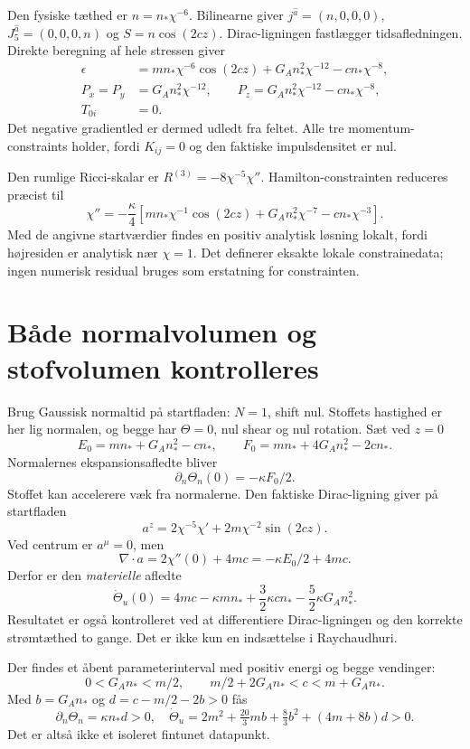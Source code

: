 \documentclass[11pt,a4paper]{article}
\begin{document}
Den fysiske tæthed er $n=n_*\chi^{-6}$. Bilinearne giver $j^{\hat a}=(n,0,0,0)$, $J_5^{\hat a}=(0,0,0,n)$ og $S=n\cos(2cz)$. Dirac-ligningen fastlægger tidsafledningen. Direkte beregning af hele stressen giver
\begin{align*}
 \epsilon&=mn_*\chi^{-6}\cos(2cz)+G_A n_*^2\chi^{-12}-cn_*\chi^{-8},\\
 P_x=P_y&=G_A n_*^2\chi^{-12},\qquad
 P_z=G_A n_*^2\chi^{-12}-cn_*\chi^{-8},\\
 T_{0i}&=0.
\end{align*}
Det negative gradientled er dermed udledt fra feltet. Alle tre momentum-constraints holder, fordi $K_{ij}=0$ og den faktiske impulsdensitet er nul.

Den rumlige Ricci-skalar er $R^{(3)}=-8\chi^{-5}\chi''$. Hamilton-constrainten reduceres præcist til
\[
 \boxed{\chi''=-\frac\kappa4\left[mn_*\chi^{-1}\cos(2cz)
 +G_A n_*^2\chi^{-7}-cn_*\chi^{-3}\right].}
\]
Med de angivne startværdier findes en positiv analytisk løsning lokalt, fordi højresiden er analytisk nær $\chi=1$. Det definerer eksakte lokale constrainedata; ingen numerisk residual bruges som erstatning for constrainten.

\section{Både normalvolumen og stofvolumen kontrolleres}
Brug Gaussisk normaltid på startfladen: $N=1$, shift nul. Stoffets hastighed er her lig normalen, og begge har $\Theta=0$, nul shear og nul rotation. Sæt ved $z=0$
\[
 E_0=mn_*+G_A n_*^2-cn_*,\qquad F_0=mn_*+4G_A n_*^2-2cn_*.
\]
Normalernes ekspansionsafledte bliver
\[
 \partial_n\Theta_n(0)=-\kappa F_0/2.
\]
Stoffet kan accelerere væk fra normalerne. Den faktiske Dirac-ligning giver på startfladen
\[
 a^z=2\chi^{-5}\chi'+2m\chi^{-2}\sin(2cz).
\]
Ved centrum er $a^\mu=0$, men
\[
 \nabla\cdot a=2\chi''(0)+4mc=-\kappa E_0/2+4mc.
\]
Derfor er den \emph{materielle} afledte
\[
 \boxed{\dot\Theta_u(0)=4mc-\kappa mn_*+\frac32\kappa cn_*
 -\frac52\kappa G_A n_*^2.}
\]
Resultatet er også kontrolleret ved at differentiere Dirac-ligningen og den korrekte strømtæthed to gange. Det er ikke kun en indsættelse i Raychaudhuri.

Der findes et åbent parameterinterval med positiv energi og begge vendinger:
\[
 0<G_A n_*<m/2,\qquad m/2+2G_A n_*<c<m+G_A n_*.
\]
Med $b=G_A n_*$ og $d=c-m/2-2b>0$ fås
\[
 \partial_n\Theta_n=\kappa n_*d>0,\quad
 \dot\Theta_u=2m^2+\tfrac{20}{3}mb+\tfrac83b^2+(4m+8b)d>0.
\]
Det er altså ikke et isoleret fintunet datapunkt.
\end{document}
